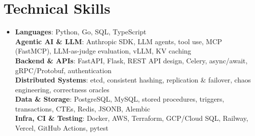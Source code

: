 \documentclass[letterpaper,11pt]{article}
\begin{document}
\section{Technical Skills}
\begin{itemize}[leftmargin=0.15in, label={}]
  \small\item{
    \textbf{Languages}{:  Python, Go, SQL, TypeScript} \\
    \textbf{Agentic AI \& LLM}{:  Anthropic SDK, LLM agents, tool use, MCP (FastMCP), LLM-as-judge evaluation, vLLM, KV caching} \\
    \textbf{Backend \& APIs}{:  FastAPI, Flask, REST API design, Celery, async/await, gRPC/Protobuf, authentication} \\
    \textbf{Distributed Systems}{:  etcd, consistent hashing, replication \& failover, chaos engineering, correctness oracles} \\
    \textbf{Data \& Storage}{:  PostgreSQL, MySQL, stored procedures, triggers, transactions, CTEs, Redis, JSONB, Alembic} \\
    \textbf{Infra, CI \& Testing}{:  Docker, AWS, Terraform, GCP/Cloud SQL, Railway, Vercel, GitHub Actions, pytest}
  }
\end{itemize}
\end{document}
